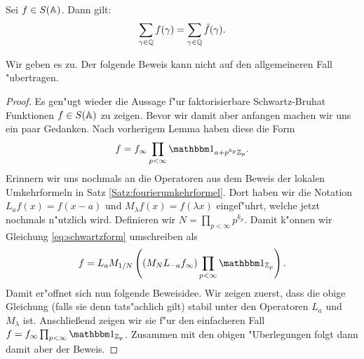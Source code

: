 	\begin{satz}\label{satz:adelic-poisson}
		Sei $f \in S(\mathbb{A})$. Dann gilt:
		\begin{align}
			\sum_{\gamma \in \mathbb{Q}} {f(\gamma)} = \sum_{\gamma \in \mathbb{Q}}{\hat{f}(\gamma)}.
		\end{align}
	\end{satz}
	Wir geben es zu. Der folgende Beweis kann nicht auf den allgemeineren Fall "ubertragen.
	\begin{proof}
		Es gen"ugt wieder die Aussage f"ur faktorisierbare Schwartz-Bruhat Funktionen $f \in S(\mathbb{A})$ zu zeigen.
		Bevor wir damit aber anfangen machen wir uns ein paar Gedanken.
		Nach vorherigem Lemma haben diese die Form
		\begin{align}\label{eq:schwartzform}
			f = f_\infty\prod_{p<\infty} \ind_{a+p^{k_p}\Zp}.
		\end{align}
		Erinnern wir uns nochmals an die Operatoren aus dem Beweis der lokalen Umkehrformeln in Satz \ref{Satz:fourierumkehrformel}.
		Dort haben wir die Notation $L_a f(x) = f(x-a)$ und $M_\lambda f(x) = f(\lambda x)$ eingef"uhrt, welche jetzt nochmals n"utzlich wird.
		Definieren wir $N= \prod_{p<\infty} p^{k_p}$. Damit k"onnen wir Gleichung \ref{eq:schwartzform} umschreiben als
		\begin{align*}
			f = L_a M_{1/N}\left( \left(M_{N} L_{-a} f_\infty\right) \prod_{p<\infty}\ind_{\Zp}\right).
		\end{align*}
		Damit er"offnet sich nun folgende Beweisidee. 
		Wir zeigen zuerst, dass die obige Gleichung (falls sie denn tats"achlich gilt) stabil unter den Operatoren $L_a$ und $M_\lambda$ ist.
		Anschließend zeigen wir sie f"ur den einfacheren Fall $f=f_\infty \prod_{p<\infty}\ind_{\Zp}$.
		Zusammen mit den obigen "Uberlegungen folgt dann damit aber der Beweis.
		

\end{proof}
